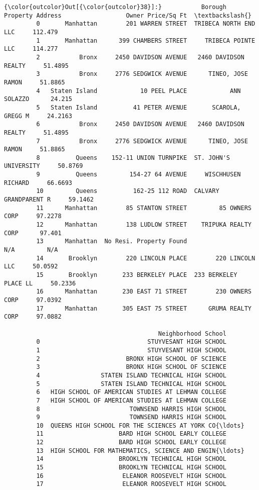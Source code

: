 \documentclass[11pt]{article}
\begin{document}
\begin{Verbatim}[commandchars=\\\{\}]
{\color{outcolor}Out[{\color{outcolor}38}]:}           Borough         Property Address                  Owner Price/Sq Ft  \textbackslash{}
         0       Manhattan        201 WARREN STREET  TRIBECA NORTH END LLC     112.479   
         1       Manhattan      399 CHAMBERS STREET     TRIBECA POINTE LLC     114.277   
         2           Bronx     2450 DAVIDSON AVENUE   2460 DAVIDSON REALTY     51.4895   
         3           Bronx     2776 SEDGWICK AVENUE      TINEO, JOSE RAMON     51.8865   
         4   Staten Island            10 PEEL PLACE            ANN SOLAZZO      24.215   
         5   Staten Island          41 PETER AVENUE       SCAROLA, GREGG M     24.2163   
         6           Bronx     2450 DAVIDSON AVENUE   2460 DAVIDSON REALTY     51.4895   
         7           Bronx     2776 SEDGWICK AVENUE      TINEO, JOSE RAMON     51.8865   
         8          Queens    152-11 UNION TURNPIKE  ST. JOHN'S UNIVERSITY     50.8769   
         9          Queens         154-27 64 AVENUE     WISCHHUSEN RICHARD     66.6693   
         10         Queens          162-25 112 ROAD  CALVARY GRANDPARENT R     59.1462   
         11      Manhattan        85 STANTON STREET         85 OWNERS CORP     97.2278   
         12      Manhattan        138 LUDLOW STREET    TRIPUKA REALTY CORP      97.401   
         13      Manhattan  No Resi. Property Found                    N/A         N/A   
         14       Brooklyn        220 LINCOLN PLACE        220 LINCOLN LLC     50.0592   
         15       Brooklyn       233 BERKELEY PLACE  233 BERKELEY PLACE LL     50.2336   
         16      Manhattan       230 EAST 71 STREET        230 OWNERS CORP     97.0392   
         17      Manhattan       305 EAST 75 STREET      GRUMA REALTY CORP     97.0882   
         
                                           Neighborhood School  
         0                              STUYVESANT HIGH SCHOOL  
         1                              STUYVESANT HIGH SCHOOL  
         2                        BRONX HIGH SCHOOL OF SCIENCE  
         3                        BRONX HIGH SCHOOL OF SCIENCE  
         4                 STATEN ISLAND TECHNICAL HIGH SCHOOL  
         5                 STATEN ISLAND TECHNICAL HIGH SCHOOL  
         6   HIGH SCHOOL OF AMERICAN STUDIES AT LEHMAN COLLEGE  
         7   HIGH SCHOOL OF AMERICAN STUDIES AT LEHMAN COLLEGE  
         8                         TOWNSEND HARRIS HIGH SCHOOL  
         9                         TOWNSEND HARRIS HIGH SCHOOL  
         10  QUEENS HIGH SCHOOL FOR THE SCIENCES AT YORK CO{\ldots}  
         11                     BARD HIGH SCHOOL EARLY COLLEGE  
         12                     BARD HIGH SCHOOL EARLY COLLEGE  
         13  HIGH SCHOOL FOR MATHEMATICS, SCIENCE AND ENGIN{\ldots}  
         14                     BROOKLYN TECHNICAL HIGH SCHOOL  
         15                     BROOKLYN TECHNICAL HIGH SCHOOL  
         16                      ELEANOR ROOSEVELT HIGH SCHOOL  
         17                      ELEANOR ROOSEVELT HIGH SCHOOL  
\end{Verbatim}
            
\end{document}
